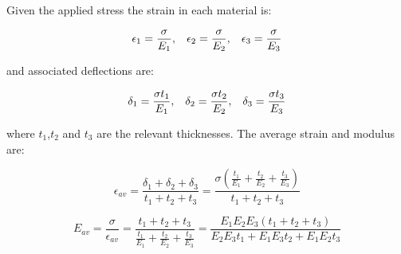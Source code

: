 \documentclass[hidelinks]{article}
\numberwithin{equation}{section}
\begin{document}
    \noi Given the applied stress the strain in each material is:

    \begin{equation}\label{eq: series-youngs-mod-strains}
        \epsilon_1 = \frac{\sigma}{E_1}, \hspace{0.3cm} 
        \epsilon_2 = \frac{\sigma}{E_2}, \hspace{0.3cm} 
        \epsilon_3= \frac{\sigma}{E_3}
    \end{equation}

    \noi and associated deflections are:

    \begin{equation}\label{eq: series-youngs-mod-delfections}
        \delta_1 = \frac{\sigma t_1}{E_1}, \hspace{0.3cm} 
        \delta_2 = \frac{\sigma t_2}{E_2}, \hspace{0.3cm} 
        \delta_3 = \frac{\sigma t_3}{E_3}
    \end{equation}

    \noi where $t_1$,$t_2$ and $t_3$ are the relevant thicknesses. The average 
    strain and modulus are:

    \begin{equation}\label{eq: series-youngs-mod-av-strain}
        \epsilon_{av} = \frac{\delta_1 + \delta_2 + \delta_3}
        {t_1 + t_2 + t_3} = \frac{\sigma (\frac{t_1}{E_1} + \frac{t_2}{E_2} + 
        \frac{t_3}{E_3})}{t_1 + t_2 + t_3}
    \end{equation}

    \begin{equation}\label{eq: series-youngs-mod-av-mod}
        E_{av} = \frac{\sigma}{\epsilon_{av}} = \frac{t_1 + t_2 + t_3}
        {\frac{t_1}{E_1} + \frac{t_2}{E_2} + \frac{t_3}{E_3}} = 
        \frac{E_1E_2E_3(t_1+t_2+t_3)}{E_2E_3t_1 + E_1E_3t_2 + E_1E_2t_3}
    \end{equation}\\
\end{document}
